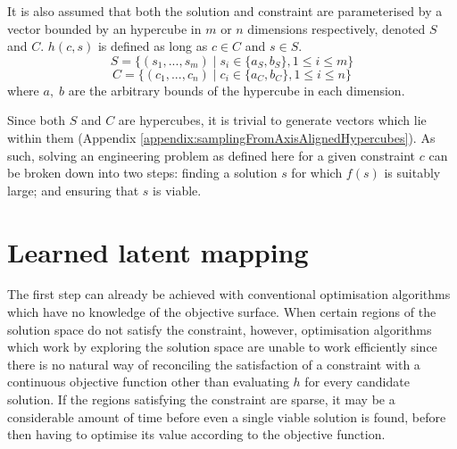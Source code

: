 \documentclass[../../main.tex]{subfiles}
\begin{document}
It is also assumed that both the solution and constraint are parameterised by a vector bounded by an hypercube in $m$ or $n$ dimensions respectively, denoted $S$ and $C$.
$h(c,s)$ is defined as long as $c\in C$ and $s\in S$.
\begin{equation}
    S=\{(s_1,...,s_m)\;|\;s_i\in\{a_S,b_S\},1\le i\le m\}
\end{equation}
\begin{equation}
    C=\{(c_1,...,c_n)\;|\;c_i\in\{a_C,b_C\},1\le i\le n\}
\end{equation}
where $a,\;b$ are the arbitrary bounds of the hypercube in each dimension.

Since both $S$ and $C$ are hypercubes, it is trivial to generate vectors which lie within them (Appendix \ref{appendix:samplingFromAxisAlignedHypercubes}).
As such, solving an engineering problem as defined here for a given constraint $c$ can be broken down into two steps: finding a solution $s$ for which $f(s)$ is suitably large; and ensuring that $s$ is viable.

\section{Learned latent mapping} \label{section:learnedLatentMapping}

The first step can already be achieved with conventional optimisation algorithms which have no knowledge of the objective surface.
When certain regions of the solution space do not satisfy the constraint, however, optimisation algorithms which work by exploring the solution space are unable to work efficiently since there is no natural way of reconciling the satisfaction of a constraint with a continuous objective function other than evaluating $h$ for every candidate solution.
If the regions satisfying the constraint are sparse, it may be a considerable amount of time before even a single viable solution is found, before then having to optimise its value according to the objective function.
\end{document}
